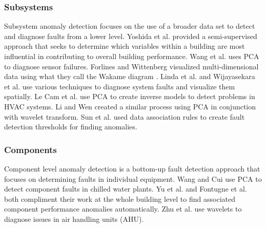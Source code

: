 \subsubsection{Subsystems}
Subsystem anomaly detection focuses on the use of a broader data set to detect and diagnose faults from a lower level. Yoshida et al. \cite{yoshida_identification_2008} provided a semi-supervised approach that seeks to determine which variables within a building are most influential in contributing to overall building performance. Wang et al. \cite{wang_system-level_2010} uses PCA to diagnose sensor failures. Forlines and Wittenberg visualized multi-dimensional data using what they call the Wakame diagram \cite{forlines_wakame:_2010}. Linda et al. \cite{linda_computational_2012} and Wijayasekara et al. \cite{wijayasekara_mining_2014} use various techniques to diagnose system faults and visualize them spatially. Le Cam et al. \cite{le_cam_application_2014} use PCA to create inverse models to detect problems in HVAC systems. Li and Wen \cite{li_model-based_2014} created a similar process using PCA in conjunction with wavelet transform.  Sun et al. \cite{sun_efficient_2015} used data association rules to create fault detection thresholds for finding anomalies.

\subsubsection{Components}
Component level anomaly detection is a bottom-up fault detection approach that focuses on determining faults in individual equipment. Wang and Cui \cite{wang_sensor-fault_2005} use PCA to detect component faults in chilled water plants. Yu et al. \cite{yu_novel_2012} and Fontugne et al. \cite{fontugne_mining_2013} both compliment their work at the whole building level to find associated component performance anomalies automatically. Zhu et al. \cite{zhu_fault_2012} use wavelets to diagnose issues in air handling units (AHU).
